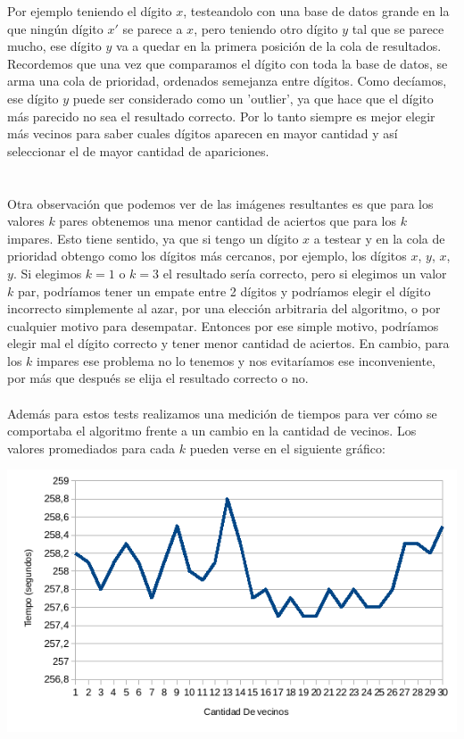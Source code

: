 Por ejemplo teniendo el dígito $x$, testeandolo con una base de datos grande en la que ningún dígito $x'$ se parece a $x$, pero teniendo otro dígito $y$ tal que se parece mucho, ese dígito $y$ va a quedar en la primera posición de la cola de resultados.
Recordemos que una vez que comparamos el dígito con toda la base de datos, se arma una cola de prioridad, ordenados semejanza entre dígitos.
Como decíamos, ese dígito $y$ puede ser considerado como un 'outlier', ya que hace que el dígito más parecido no sea el resultado correcto. Por lo tanto siempre es mejor elegir más vecinos para saber cuales dígitos aparecen en mayor cantidad y así seleccionar el de mayor cantidad de apariciones.
\\
\\ \\
Otra observación que podemos ver de las imágenes resultantes es que para los valores $k$ pares obtenemos una menor cantidad de aciertos que para los $k$ impares.
Esto tiene sentido, ya que si tengo un dígito $x$ a testear y en la cola de prioridad obtengo como los dígitos más cercanos, por ejemplo, los dígitos $x$, $y$, $x$, $y$.
Si elegimos $k=1$ o $k=3$ el resultado sería correcto, pero si elegimos un valor $k$ par, podríamos tener un empate entre 2 dígitos y podríamos elegir el dígito incorrecto simplemente al azar, por una elección arbitraria del algoritmo, o por cualquier motivo para desempatar. Entonces por ese simple motivo, podríamos elegir mal el dígito correcto y tener menor cantidad de aciertos. En cambio, para los $k$ impares ese problema no lo tenemos y nos evitaríamos ese inconveniente, por más que después se elija el resultado correcto o no.
\\ \\
Además para estos tests realizamos una medición de tiempos para ver cómo se comportaba el algoritmo frente a un cambio en la cantidad de vecinos. Los valores promediados para cada $k$ pueden verse en el siguiente gráfico:

\includegraphics[scale=0.55]{nuevosResultados/knn/knntemp.png}\\

